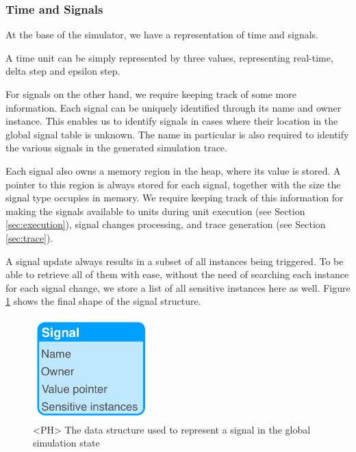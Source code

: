 
\subsubsection{Time and Signals}
At the base of the simulator, we have a representation of time and signals.

A time unit can be simply represented by three values, representing real-time, delta step and epsilon step.

For signals on the other hand, we require keeping track of some more information. Each signal can be uniquely identified through its name and owner instance. This enables us to identify signals in cases where their location in the global signal table is unknown. The name in particular is also required to identify the various signals in the generated simulation trace.

Each signal also owns a memory region in the heap, where its value is stored. A pointer to this region is always stored for each signal, together with the size the signal type occupies in memory. We require keeping track of this information for making the signals available to units during unit execution (see Section \ref{sec:execution}), signal changes processing, and trace generation (see Section \ref{sec:trace}).

A signal update always results in a subset of all instances being triggered. To be able to retrieve all of them with ease, without the need of searching each instance for each signal change, we store a list of all sensitive instances here as well. Figure \ref{fig:sig} shows the final shape of the signal structure.

\begin{figure}[ht]
    \centering
    \includegraphics[width=0.4\textwidth]{gfx/Signal.png}
    \caption{<PH> The data structure used to represent a signal in the global simulation state}
    \label{fig:sig}
\end{figure}


